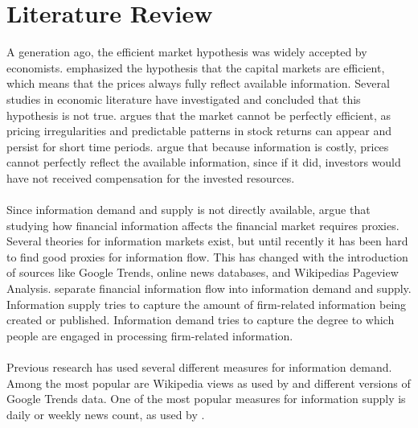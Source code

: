 
\chapter{Literature Review}
A generation ago, the efficient market hypothesis was widely accepted by economists. \cite{fama} emphasized the hypothesis that the capital markets are efficient, which means that the prices always fully reflect available information. Several studies in economic literature have investigated and concluded that this hypothesis is not true. \cite{malkiel} argues that the market cannot be perfectly efficient, as pricing irregularities and predictable patterns in stock returns can appear and persist for short time periods. \cite{grossman} argue that because information is costly, prices cannot perfectly reflect the available information, since if it did, investors would have not received compensation for the invested resources.
\\\\
Since information demand and supply is not directly available,  \cite{vlastakis} argue that studying how financial information affects the financial market requires proxies. Several theories for information markets exist, but until recently it has been hard to find good proxies for information flow. This has changed with the introduction of sources like Google Trends, online news databases, and Wikipedias Pageview Analysis. \cite{vlastakis} separate financial information flow into information demand and supply. Information supply tries to capture the amount of firm-related information being created or published. Information demand tries to capture the degree to which people are engaged in processing firm-related information.
\\\\
 Previous research has used several different measures for information demand. Among the most popular are Wikipedia views as used by \cite{moat} and different versions of Google Trends data. One of the most popular measures for information supply is daily or weekly news count, as used by \cite{vlastakis}.
\\\\
